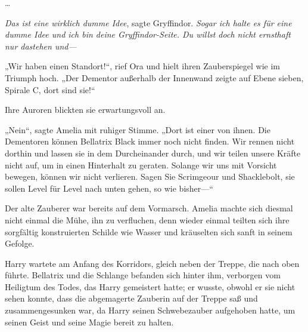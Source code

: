 …

\emph{Das ist eine wirklich dumme Idee}, sagte Gryffindor. \emph{Sogar ich halte es für eine dumme Idee und ich bin deine Gryffindor-Seite. Du willst doch nicht ernsthaft nur dastehen und—}

\later

„Wir haben einen Standort!“, rief Ora und hielt ihren Zauberspiegel wie im Triumph hoch.
„Der Dementor außerhalb der Innenwand zeigte auf Ebene sieben, Spirale C, dort sind sie!“

Ihre Auroren blickten sie erwartungsvoll an.

„Nein“, sagte Amelia mit ruhiger Stimme.
„Dort ist einer von ihnen. Die Dementoren können Bellatrix Black immer noch nicht finden. Wir rennen nicht dorthin und lassen sie in dem Durcheinander durch, und wir teilen unsere Kräfte nicht auf, um in einen Hinterhalt zu geraten. Solange wir uns mit Vorsicht bewegen, können wir nicht verlieren. Sagen Sie Scrimgeour und Shacklebolt, sie sollen Level für Level nach unten gehen, so wie bisher—“

Der alte Zauberer war bereits auf dem Vormarsch. Amelia machte sich diesmal nicht einmal die Mühe, ihn zu verfluchen, denn wieder einmal teilten sich ihre sorgfältig konstruierten Schilde wie Wasser und kräuselten sich sanft in seinem Gefolge.

\later

Harry wartete am Anfang des Korridors, gleich neben der Treppe, die nach oben führte. Bellatrix und die Schlange befanden sich hinter ihm, verborgen vom Heiligtum des Todes, das Harry gemeistert hatte; er wusste, obwohl er sie nicht sehen konnte, dass die abgemagerte Zauberin auf der Treppe saß und zusammengesunken war, da Harry seinen Schwebezauber aufgehoben hatte, um seinen Geist und seine Magie bereit zu halten.

